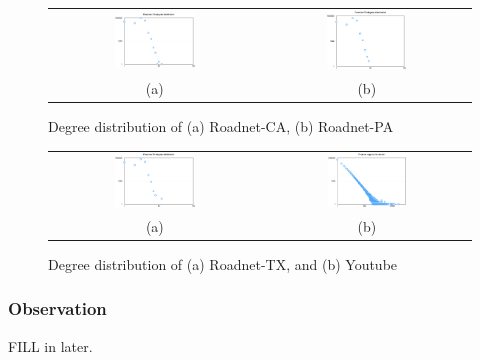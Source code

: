 \begin{figure}[hf]
\begin{center}
\begin{tabular}{cc}
     \includegraphics[width=0.4\textwidth]{FIG/t1_ca.png} &      \includegraphics[width=0.4\textwidth]{FIG/t1_pa.png} \\
     (a) & (b)
\end{tabular}
\caption{Degree distribution of (a) Roadnet-CA, (b) Roadnet-PA}
\label{t1:ca}
\end{center}
\end{figure}

\begin{figure}[hf]
\begin{center}
\begin{tabular}{cc}
     \includegraphics[width=0.4\textwidth]{FIG/t1_tx.png} & 
     \includegraphics[width=0.4\textwidth]{FIG/t1_youtube.png} \\
     (a) & (b)
\end{tabular}
\caption{Degree distribution of (a) Roadnet-TX, and (b) Youtube}
\label{t1:tx}
\end{center}
\end{figure}

\subsubsection{Observation}
FILL in later. 